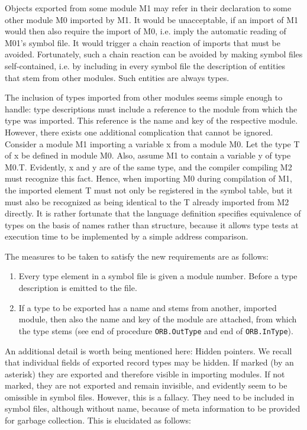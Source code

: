 Objects exported from some module M1 may refer in their declaration to some other module M0
imported by M1. It would be unacceptable, if an import of M1 would then also require the import of
M0, i.e. imply the automatic reading of M01's symbol file. It would trigger a chain reaction of imports
that must be avoided. Fortunately, such a chain reaction can be avoided by making symbol files
self-contained, i.e. by including in every symbol file the description of entities that stem from other
modules. Such entities are always types.

The inclusion of types imported from other modules seems simple enough to handle: type
descriptions must include a reference to the module from which the type was imported. This
reference is the name and key of the respective module. However, there exists one additional
complication that cannot be ignored. Consider a module M1 importing a variable x from a module
M0. Let the type T of x be defined in module M0. Also, assume M1 to contain a variable y of type
M0.T. Evidently, x and y are of the same type, and the compiler compiling M2 must recognize this
fact. Hence, when importing M0 during compilation of M1, the imported element T must not only be
registered in the symbol table, but it must also be recognized as being identical to the T already
imported from M2 directly. It is rather fortunate that the language definition specifies equivalence of
types on the basis of names rather than structure, because it allows type tests at execution time to
be implemented by a simple address comparison.

The measures to be taken to satisfy the new requirements are as follows:
\begin{enumerate}
  \item Every type element in a symbol file is given a module number. Before a type description is
    emitted to the file.
  \item If a type to be exported has a name and stems from another, imported module, then also the
    name and key of the module are attached, from which the type stems (see end of procedure
    \verb|ORB.OutType| and end of \verb|ORB.InType|).
\end{enumerate}

An additional detail is worth being mentioned here: Hidden pointers. We recall that individual fields
of exported record types may be hidden. If marked (by an asterisk) they are exported and therefore
visible in importing modules. If not marked, they are not exported and remain invisible, and
evidently seem to be omissible in symbol files. However, this is a fallacy. They need to be included
in symbol files, although without name, because of meta information to be provided for garbage
collection. This is elucidated as follows:

